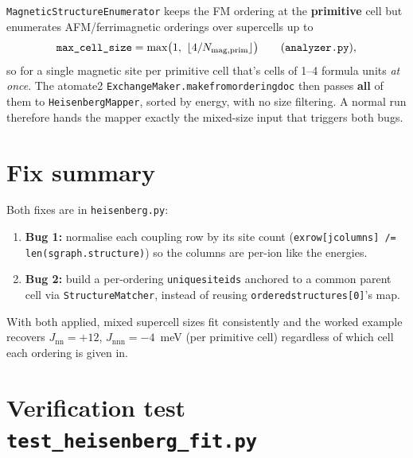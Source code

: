 \documentclass[11pt]{article}
\newcommand{\code}[1]{\texttt{\def\_{\textunderscore\allowbreak}#1}}
\begin{document}
\code{MagneticStructureEnumerator} keeps the FM ordering at the
\textbf{primitive} cell but enumerates AFM/ferrimagnetic orderings over
supercells up to
\[
  \texttt{max\_cell\_size} = \max\!\big(1,\ \lfloor 4/N_{\mathrm{mag,prim}}\rfloor\big)
  \qquad(\code{analyzer.py}),
\]
so for a single magnetic site per primitive cell that's cells of 1--4 formula
units \emph{at once}. The atomate2 \code{ExchangeMaker.make\_from\_ordering\_doc}
then passes \textbf{all} of them to \code{HeisenbergMapper}, sorted by energy,
with no size filtering. A normal run therefore hands the mapper exactly the
mixed-size input that triggers both bugs.

\section{Fix summary}
\label{sec:fix}

Both fixes are in \code{heisenberg.py}:
\begin{enumerate}
\item \textbf{Bug 1:} normalise each coupling row by its site count
(\code{ex\_row[j\_columns] /= len(sgraph.structure)}) so the columns are per-ion
like the energies.
\item \textbf{Bug 2:} build a per-ordering \code{unique\_site\_ids} anchored to a
common parent cell via \code{StructureMatcher}, instead of reusing
\code{ordered\_structures[0]}'s map.
\end{enumerate}
With both applied, mixed supercell sizes fit consistently and the worked example
recovers $J_{\mathrm{nn}}=+12$, $J_{\mathrm{nnn}}=-4$~meV (per primitive cell)
regardless of which cell each ordering is given in.

\appendix

\section{Verification test \texttt{test\_heisenberg\_fit.py}}
\label{app:code}


\end{document}
